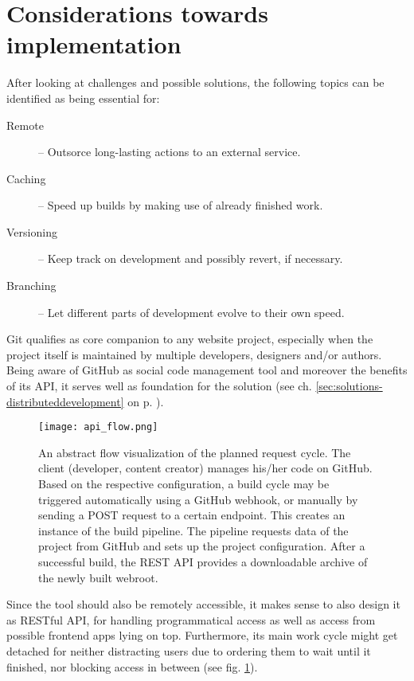 \section{Considerations towards implementation}
\label{sec:primarythoughts}

After looking at challenges and possible solutions, the following topics can be identified as being essential for:

\begin{description}
  \item[Remote] -- Outsorce long-lasting actions to an external service.
  \item[Caching] -- Speed up builds by making use of already finished work.
  \item[Versioning] -- Keep track on development and possibly revert, if necessary.
  \item[Branching] -- Let different parts of development evolve to their own speed.
\end{description}

Git qualifies as core companion to any website project, especially when the project itself is maintained by multiple developers, designers and/or authors. Being aware of GitHub as social code management tool and moreover the benefits of its API, it serves well as foundation for the solution (see ch. \ref{sec:solutions-distributeddevelopment} on p. \pageref{sec:solutions-distributeddevelopment}).

\begin{figure} %
    \centering
    \texttt{[image: api\_flow.png]}
    \caption{An abstract flow visualization of the planned request cycle. The client (developer, content creator) manages his/her code on GitHub. Based on the respective configuration, a build cycle may be triggered automatically using a GitHub webhook, or manually by sending a POST request to a certain endpoint. This creates an instance of the build pipeline. The pipeline requests data of the project from GitHub and sets up the project configuration. After a successful build, the REST API provides a downloadable archive of the newly built webroot.}
    \label{fig:api-flow}
\end{figure}
%

Since the tool should also be remotely accessible, it makes sense to also design it as RESTful API, for handling programmatical access as well as access from possible frontend apps lying on top. Furthermore, its main work cycle might get detached for neither distracting users due to ordering them to wait until it finished, nor blocking access in between (see fig. \ref{fig:api-flow}).

